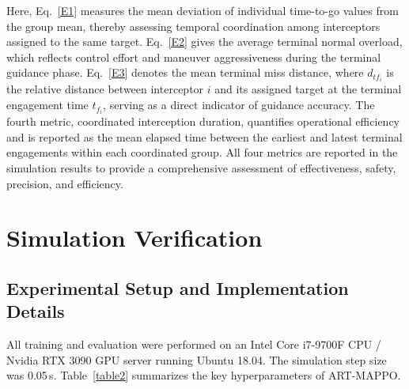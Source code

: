 \documentclass[lettersize,journal]{IEEEtran}
\begin{document}
Here, Eq.~\eqref{E1} measures the mean deviation of individual time-to-go values from the group mean, thereby assessing temporal coordination among interceptors assigned to the same target. Eq.~\eqref{E2} gives the average terminal normal overload, which reflects control effort and maneuver aggressiveness during the terminal guidance phase. Eq.~\eqref{E3} denotes the mean terminal miss distance, where $d_{tf_i}$ is the relative distance between interceptor $i$ and its assigned target at the terminal engagement time $t_{f_i}$, serving as a direct indicator of guidance accuracy. The fourth metric, coordinated interception duration, quantifies operational efficiency and is reported as the mean elapsed time between the earliest and latest terminal engagements within each coordinated group. All four metrics are reported in the simulation results to provide a comprehensive assessment of effectiveness, safety, precision, and efficiency.










\section{Simulation Verification}
\label{sec:simulation}

\subsection{Experimental Setup and Implementation Details}
\label{subsec:setup}

All training and evaluation were performed on an Intel Core i7-9700F CPU / Nvidia RTX 3090
GPU server running Ubuntu 18.04.
The simulation step size was 0.05\,s.
Table~\ref{table2} summarizes the key hyperparameters of ART-MAPPO.
\end{document}
